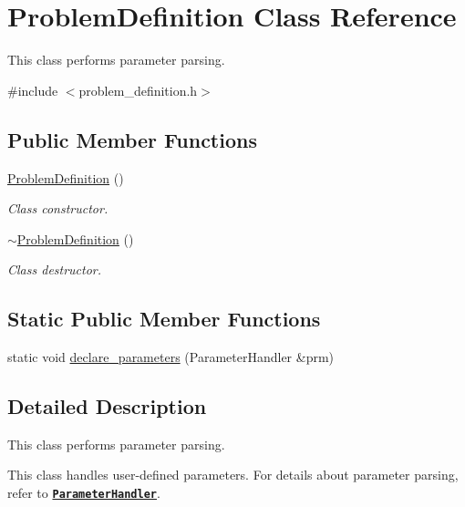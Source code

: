 \hypertarget{class_problem_definition}{}\section{Problem\+Definition Class Reference}
\label{class_problem_definition}


This class performs parameter parsing.  




{\ttfamily \#include $<$problem\+\_\+definition.\+h$>$}

\subsection*{Public Member Functions}
\begin{DoxyCompactItemize}
\item 
\hyperlink{class_problem_definition_ad5d05724dd7de8e362f0c8db129744f9}{Problem\+Definition} ()
\begin{DoxyCompactList}\small\item\em Class constructor. \end{DoxyCompactList}\item 
\hyperlink{class_problem_definition_a6aa61be43188cf28040bd0e7d2bf02e3}{$\sim$\+Problem\+Definition} ()
\begin{DoxyCompactList}\small\item\em Class destructor. \end{DoxyCompactList}\end{DoxyCompactItemize}
\subsection*{Static Public Member Functions}
\begin{DoxyCompactItemize}
\item 
static void \hyperlink{class_problem_definition_a0a68b3c08b69729642dcfd37f23e7494}{declare\+\_\+parameters} (Parameter\+Handler \&prm)
\end{DoxyCompactItemize}


\subsection{Detailed Description}
This class performs parameter parsing. 

This class handles user-\/defined parameters. For details about parameter parsing, refer to \href{https://www.dealii.org/8.5.0/doxygen/deal.II/classParameterHa
ndler.html}{\tt {\bfseries Parameter\+Handler}}.

